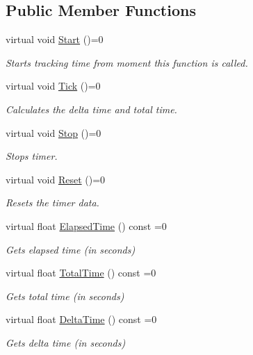 \subsection*{Public Member Functions}
\begin{DoxyCompactItemize}
\item 
virtual void \hyperlink{classHatchit_1_1Core_1_1ITimer_abf16ebbb5a924fc20cf3099280f74cf7}{Start} ()=0
\begin{DoxyCompactList}\small\item\em Starts tracking time from moment this function is called. \end{DoxyCompactList}\item 
virtual void \hyperlink{classHatchit_1_1Core_1_1ITimer_a6969cb6203be6fd3d3a002146bb55fa1}{Tick} ()=0
\begin{DoxyCompactList}\small\item\em Calculates the delta time and total time. \end{DoxyCompactList}\item 
virtual void \hyperlink{classHatchit_1_1Core_1_1ITimer_a3bb9bec5874fd1c706ced3ba8033c761}{Stop} ()=0
\begin{DoxyCompactList}\small\item\em Stops timer. \end{DoxyCompactList}\item 
virtual void \hyperlink{classHatchit_1_1Core_1_1ITimer_a4f6fc1ec97ef9345d64e75bdeadcdad2}{Reset} ()=0
\begin{DoxyCompactList}\small\item\em Resets the timer data. \end{DoxyCompactList}\item 
virtual float \hyperlink{classHatchit_1_1Core_1_1ITimer_aef2f629b7e527640a62af97dad17dcb2}{Elapsed\+Time} () const =0
\begin{DoxyCompactList}\small\item\em Gets elapsed time (in seconds) \end{DoxyCompactList}\item 
virtual float \hyperlink{classHatchit_1_1Core_1_1ITimer_af5d9551ef9a0a98591f823b014efca11}{Total\+Time} () const =0
\begin{DoxyCompactList}\small\item\em Gets total time (in seconds) \end{DoxyCompactList}\item 
virtual float \hyperlink{classHatchit_1_1Core_1_1ITimer_a201d0dd1503b393ea7c1e1acfb402cd5}{Delta\+Time} () const =0
\begin{DoxyCompactList}\small\item\em Gets delta time (in seconds) \end{DoxyCompactList}\end{DoxyCompactItemize}
